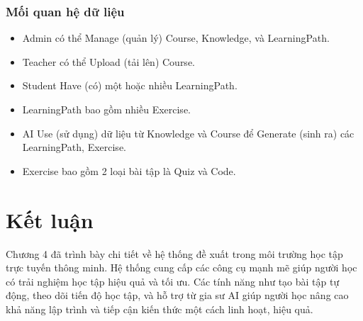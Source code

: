 \subsubsection{Mối quan hệ dữ liệu}
\begin{itemize}
    \item Admin có thể Manage (quản lý) Course, Knowledge, và LearningPath.
    \item Teacher có thể Upload (tải lên) Course.
    \item Student Have (có) một hoặc nhiều LearningPath.
    \item LearningPath bao gồm nhiều Exercise.
    \item AI Use (sử dụng) dữ liệu từ Knowledge và Course để Generate (sinh ra) các LearningPath, Exercise.
    \item Exercise bao gồm 2 loại bài tập là Quiz và Code.
\end{itemize}
\section{Kết luận}
Chương 4 đã trình bày chi tiết về hệ thống đề xuất trong môi trường học tập trực tuyến thông minh. Hệ thống cung cấp các công cụ mạnh mẽ giúp người học có trải nghiệm học tập hiệu quả và tối ưu. Các tính năng như tạo bài tập tự động, theo dõi tiến độ học tập, và hỗ trợ từ gia sư AI giúp người học nâng cao khả năng lập trình và tiếp cận kiến thức một cách linh hoạt, hiệu quả.